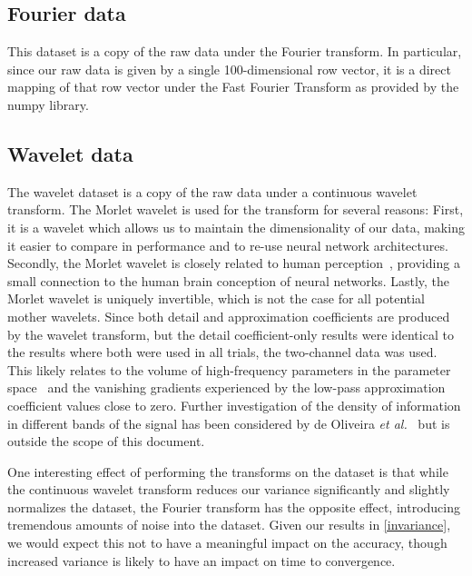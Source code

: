 \subsection{Fourier data}
This dataset is a copy of the raw data under the Fourier transform.
In particular, since our raw data is given by a single 100-dimensional row vector, it is a direct mapping of that row vector under the Fast Fourier Transform as provided by the numpy library.

\subsection{Wavelet data}
The wavelet dataset is a copy of the raw data under a continuous wavelet transform. 
The Morlet wavelet is used for the transform for several reasons:
First, it is a wavelet which allows us to maintain the dimensionality of our data, making it easier to compare in performance and to re-use neural network architectures.
Secondly, the Morlet wavelet is closely related to human perception~\cite{mallat1999wavelet, daugman1985uncertainty}, providing a small connection to the human brain conception of neural networks.
Lastly, the Morlet wavelet is uniquely invertible, which is not the case for all potential mother wavelets. 
Since both detail and approximation coefficients are produced by the wavelet transform, but the detail coefficient-only results were identical to the results where both were used in all trials, the two-channel data was used.
This likely relates to the volume of high-frequency parameters in the parameter space~\cite{rahaman2018spectral} and the vanishing gradients experienced by the low-pass approximation coefficient values close to zero.
Further investigation of the density of information in different bands of the signal has been considered by de Oliveira \textit{et al.}~\cite{de2006wavelet} but is outside the scope of this document.

One interesting effect of performing the transforms on the dataset is that while the continuous wavelet transform reduces our variance significantly and slightly normalizes the dataset, the Fourier transform has the opposite effect, introducing tremendous amounts of noise into the dataset.
Given our results in \ref{invariance}, we would expect this not to have a meaningful impact on the accuracy, though increased variance is likely to have an impact on time to convergence.

